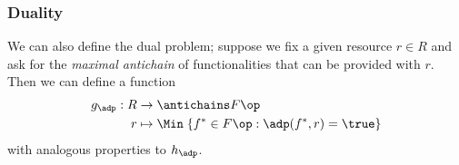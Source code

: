 %
%





\subsubsection{Duality}


We can also define the dual problem; suppose we fix a given resource $r \in R$ and ask for the \emph{maximal antichain} of functionalities that can be provided with $r$. Then we can define a function
\begin{equation}
\begin{aligned}
g_\adp : R &\to \antichains F\op \\
r &\mapsto \Min \; \{ f^* \in F\op : \adp(f^*, r) = \true \}
\end{aligned}
\end{equation}
with analogous properties to $h_\adp$.

